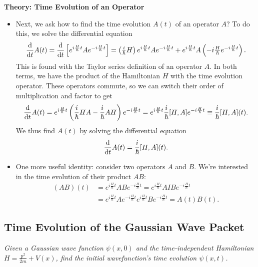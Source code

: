\documentclass[11pt, a4paper]{article}
\newcommand{\tev}{e^{-i\frac{H}{\hbar}t}}  %
\newcommand{\tevp}{e^{i\frac{H}{\hbar}t}}  %
\begin{document}
\textbf{Theory: Time Evolution of an Operator}
\begin{itemize}
	\item Next, we ask how to find the time evolution $ A(t) $ of an operator $ A $? To do this, we solve the differential equation
	\begin{equation*}
		\dv{t}A(t) = \dv{t}\left[\tevp A \tev \right] = \left(\tfrac{i}{\hbar}H\right)\tevp A \tev + \tevp A\left(-i\tfrac{H}{\hbar}\tev\right).
	\end{equation*}
	This is found with the Taylor series definition of an operator $ A $. In both terms, we have the product of the Hamiltonian $ H $ with the time evolution operator. These operators commute, so we can switch their order of multiplication and factor to get
	\begin{equation*}
		\dv{t}A(t) = \tevp \left(\frac{i}{\hbar}HA - \frac{i}{\hbar}AH\right) \tev = \tevp \frac{i}{\hbar}[H, A]\tev \equiv \frac{i}{\hbar}[H, A](t).
	\end{equation*}
	We thus find $ A(t) $ by solving the differential equation
	\begin{equation*}
		\dv{t}A(t) = \frac{i}{\hbar}[H, A](t).
	\end{equation*}
	
	\item One more useful identity: consider two operators $ A $ and $ B $. We're interested in the time evolution of their product $ AB $: 
	\begin{align*}
		(AB)(t) &= \tevp AB \tev = \tevp A I B \tev\\
		&=\tevp A \tev \tevp B \tev = A(t)B(t).
	\end{align*}

\end{itemize}


\subsection{Time Evolution of the Gaussian Wave Packet}
\textit{Given a Gaussian wave function $ \psi(x, 0) $ and the time-independent Hamiltonian $ H = \frac{p^{2}}{2m} + V(x) $, find the initial wavefunction's time evolution $ \psi(x, t) $.}
\end{document}
